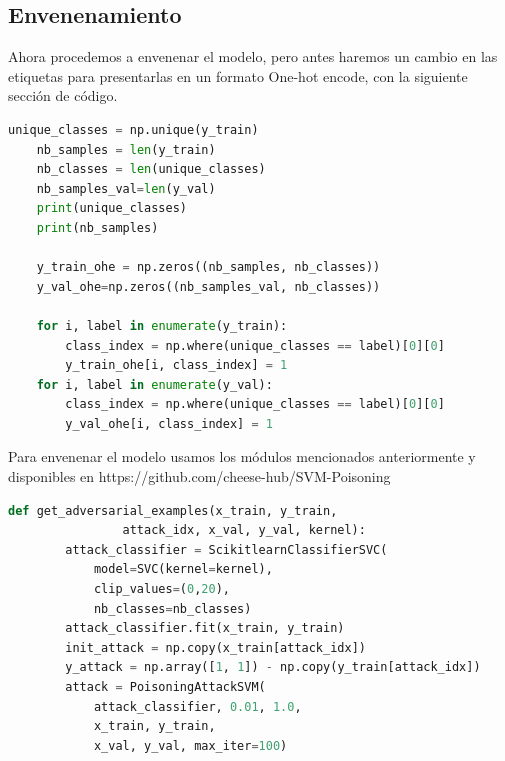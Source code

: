 \documentclass[letterpaper,12pt,oneside]{book}
\begin{document}
{{{{\subsection{Envenenamiento}
Ahora procedemos a envenenar el modelo, pero antes haremos un cambio en las etiquetas para presentarlas en un formato One-hot encode, con la siguiente sección de código.
\begin{lstlisting}[language=Python]
    unique_classes = np.unique(y_train)
    nb_samples = len(y_train)
    nb_classes = len(unique_classes)
    nb_samples_val=len(y_val)
    print(unique_classes)
    print(nb_samples)
    
    y_train_ohe = np.zeros((nb_samples, nb_classes))
    y_val_ohe=np.zeros((nb_samples_val, nb_classes))
    
    for i, label in enumerate(y_train):
        class_index = np.where(unique_classes == label)[0][0]
        y_train_ohe[i, class_index] = 1
    for i, label in enumerate(y_val):
        class_index = np.where(unique_classes == label)[0][0]
        y_val_ohe[i, class_index] = 1
\end{lstlisting}
Para envenenar el modelo usamos los módulos mencionados anteriormente y disponibles en https://github.com/cheese-hub/SVM-Poisoning
\begin{lstlisting}[language=Python]
    def get_adversarial_examples(x_train, y_train, 
    			attack_idx, x_val, y_val, kernel):
        attack_classifier = ScikitlearnClassifierSVC(
        	model=SVC(kernel=kernel),
            clip_values=(0,20),
            nb_classes=nb_classes)
        attack_classifier.fit(x_train, y_train)
        init_attack = np.copy(x_train[attack_idx])
        y_attack = np.array([1, 1]) - np.copy(y_train[attack_idx])
        attack = PoisoningAttackSVM(
        	attack_classifier, 0.01, 1.0,
            x_train, y_train,
            x_val, y_val, max_iter=100)
    

\end{lstlisting}}}}}
\end{document}
